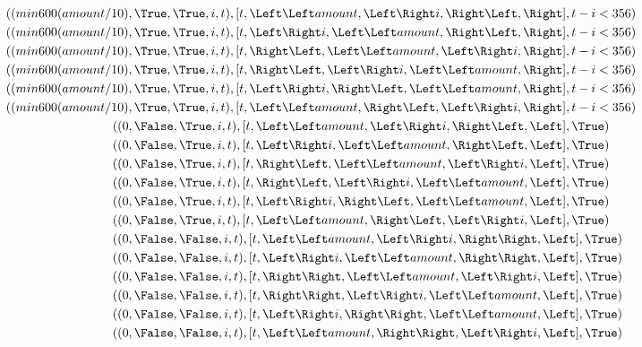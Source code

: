 \begin{align*}
  ((min 600 (amount/10)&,  \True, \True, i, t),[t,\Left \Left amount,     \Left \Right i, \Right \Left, \Right],t-i<356)\\
  ((min 600 (amount/10)&,  \True, \True, i, t),[t,    \Left \Right i, \Left \Left amount, \Right \Left, \Right],t-i<356)\\
  ((min 600 (amount/10)&,  \True, \True, i, t),[t,      \Right \Left, \Left \Left amount, \Left \Right i, \Right],t-i<356)\\
  ((min 600 (amount/10)&,  \True, \True, i, t),[t,      \Right \Left, \Left \Right i, \Left \Left amount, \Right],t-i<356)\\
  ((min 600 (amount/10)&,  \True, \True, i, t),[t,    \Left \Right i, \Right \Left, \Left \Left amount, \Right],t-i<356)\\
  ((min 600 (amount/10)&,  \True, \True, i, t),[t,\Left \Left amount, \Right \Left, \Left \Right i, \Right],t-i<356)\\
  ((                  0&, \False, \True, i, t),[t,\Left \Left amount, \Left \Right i, \Right \Left, \Left],\True)\\
  ((                  0&, \False, \True, i, t),[t,    \Left \Right i, \Left \Left amount, \Right \Left, \Left],\True)\\
  ((                  0&, \False, \True, i, t),[t,      \Right \Left, \Left \Left amount, \Left \Right i, \Left],\True)\\
  ((                  0&, \False, \True, i, t),[t,      \Right \Left, \Left \Right i, \Left \Left amount, \Left],\True)\\
  ((                  0&, \False, \True, i, t),[t,    \Left \Right i, \Right \Left, \Left \Left amount, \Left],\True)\\
  ((                  0&, \False, \True, i, t),[t,\Left \Left amount, \Right \Left, \Left \Right i, \Left],\True)\\
  ((                  0&, \False,\False, i, t),[t,\Left \Left amount, \Left \Right i, \Right \Right, \Left],\True)\\
  ((                  0&, \False,\False, i, t),[t,\Left \Right i, \Left \Left amount, \Right \Right, \Left],\True)\\
  ((                  0&, \False,\False, i, t),[t,\Right \Right,\Left \Left amount, \Left \Right i, \Left],\True)\\
  ((                  0&, \False,\False, i, t),[t,\Right \Right, \Left \Right i, \Left \Left amount, \Left],\True)\\
  ((                  0&, \False,\False, i, t),[t, \Left \Right i, \Right \Right, \Left \Left amount, \Left],\True)\\
  ((                  0&, \False,\False, i, t),[t, \Left \Left amount, \Right \Right, \Left \Right i, \Left],\True)\\
\end{align*}


